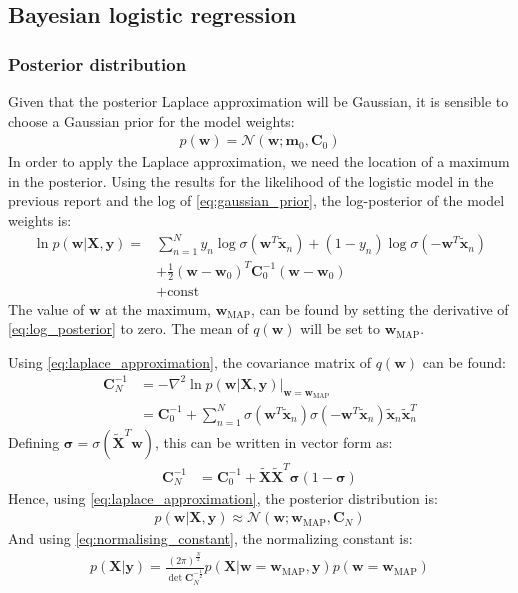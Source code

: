 \documentclass[a4paper]{article}
\begin{document}
    \subsection{Bayesian logistic regression}
    \subsubsection{Posterior distribution}
    Given that the posterior Laplace approximation will be Gaussian, it is sensible to choose a Gaussian prior for the model weights:
    \begin{align}
        p(\bm{w}) = \mathcal{N}(\bm{w}; \bm{m}_0, \bm{C}_0)
        \label{eq:gaussian_prior}
    \end{align}
    In order to apply the Laplace approximation, we need the location of a maximum in the posterior.
    Using the results for the likelihood of the logistic model in the previous report and the log of \autoref{eq:gaussian_prior}, the log-posterior of the model weights is:
    \begin{align}
        \ln p(\bm{w} | \bm{X}, \bm{y}) =
        & \sum_{n=1}^{N} y_n \log\sigma( \bm{w}^T \tilde{\bm{x}}_n) + (1-y_n) \log\sigma(-\bm{w}^T \tilde{\bm{x}}_n) \nonumber \\
        & + \frac{1}{2} (\bm{w} - \bm{w}_0)^T \bm{C}_0^{-1} (\bm{w} - \bm{w}_0) \nonumber \\
        & + \text{const}
        \label{eq:log_posterior}
    \end{align}
    The value of $\bm{w}$ at the maximum, $\bm{w}_{\text{MAP}}$, can be found by setting the derivative of
    \autoref{eq:log_posterior} to zero.
    The mean of $q(\bm{w})$ will be set to $\bm{w}_{\text{MAP}}$.

    Using \autoref{eq:laplace_approximation}, the covariance matrix of $q(\bm{w})$ can be found:
    \begin{align}
        \bm{C}_N^{-1} &= -\nabla^2 \ln p(\bm{w} | \bm{X}, \bm{y}) \big|_{\bm{w} =\bm{w}_{\text{MAP}}} \nonumber \\
        &= \bm{C}_0^{-1}
        + \sum_{n=1}^N \sigma(\bm{w}^T \tilde{\bm{x}}_n) \sigma(-\bm{w}^T \tilde{\bm{x}}_n)\tilde{\bm{x}}_n\tilde{\bm{x}}_n^T
    \end{align}
    Defining $\bm{\sigma} = \sigma(\tilde{\bm{X}}^T \bm{w})$, this can be written in vector form as:
    \begin{align}
         \bm{C}_N^{-1} &= \bm{C}_0^{-1} + \tilde{\bm{X}}\tilde{\bm{X}}^T \bm{\sigma} (1 - \bm{\sigma})
    \end{align}
    Hence, using \autoref{eq:laplace_approximation}, the posterior distribution is:
    \begin{align}
        p(\bm{w} | \bm{X}, \bm{y}) \approx \mathcal{N}(\bm{w}; \bm{w}_\text{MAP}, \bm{C}_N)
    \end{align}
    And using \autoref{eq:normalising_constant}, the normalizing constant is:
    \begin{align}
        p(\bm{X} | \bm{y}) = \frac{(2\pi)^\frac{N}{2}}{\det \bm{C}_N^{-\frac{1}{2}}}
                            p(\bm{X} | \bm{w} = \bm{w}_\text{MAP}, \bm{y}) p(\bm{w} = \bm{w}_\text{MAP})
    \end{align}
\end{document}
